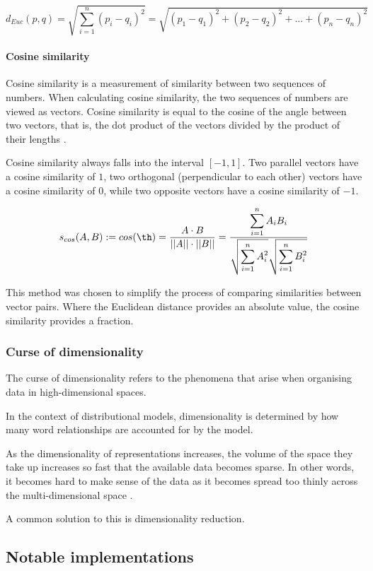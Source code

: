 \documentclass[14pt, a4paper]{extreport}
\begin{document}
\medskip
\[d_{Euc}(p, q) = \sqrt{\displaystyle\sum_{i=1}^{n} (p_i - q_i)^2} = \sqrt{(p_1 - q_1)^2 + (p_2 - q_2)^2 + ... + (p_n - q_n)^2}\]

\paragraph{Cosine similarity}

Cosine similarity is a measurement of similarity between two sequences of numbers. When calculating cosine similarity, the two sequences of numbers are viewed as vectors. Cosine similarity is equal to the cosine of the angle between two vectors, that is, the dot product of the vectors divided by the product of their lengths \parencite{oduntan}.

Cosine similarity always falls into the interval \([-1, 1]\). Two parallel vectors have a cosine similarity of \(1\), two orthogonal (perpendicular to each other) vectors have a cosine similarity of \(0\), while two opposite vectors have a cosine similarity of \(-1\).

\medskip
\[s_{cos}(A, B) := cos(\th) = \frac {A \cdot B}{||A|| \cdot ||B||} = \frac {\displaystyle\sum_{i=1}^{n} A_i B_i}{\sqrt{\displaystyle\sum_{i=1}^{n} A_i^2} \sqrt{\displaystyle\sum_{i=1}^{n} B_i^2}}\]
\medskip

This method was chosen to simplify the process of comparing similarities between vector pairs. Where the Euclidean distance provides an absolute value, the cosine similarity provides a fraction.
      \subsubsection{Curse of dimensionality}
The curse of dimensionality refers to the phenomena that arise when organising data in high-dimensional spaces.

In the context of distributional models, dimensionality is determined by how many word relationships are accounted for by the model.

As the dimensionality of representations increases, the volume of the space they take up increases so fast that the available data becomes sparse. In other words, it becomes hard to make sense of the data as it becomes spread too thinly across the multi-dimensional space \parencite{venkat}.

A common solution to this is dimensionality reduction.

    \subsection{Notable implementations}
\end{document}
